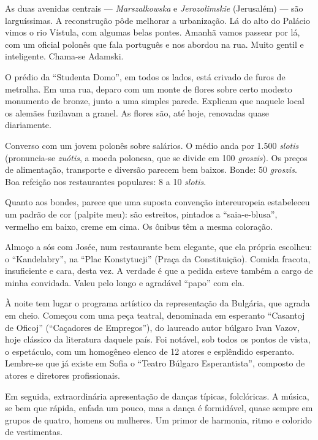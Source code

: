 As duas avenidas centrais --- \textit{Marszalkowska} e \textit{Jerozolimskie} (Jerusalém) --- são larguíssimas. A reconstrução pôde melhorar a urbanização. Lá do alto do Palácio vimos o rio Vístula, com algumas belas pontes. Amanhã vamos passear por lá, com um oficial polonês que fala português e nos abordou na rua. Muito gentil e inteligente. Chama-se Adamski.

O prédio da ``Studenta Domo'', em todos os lados, está crivado de furos de metralha. Em uma rua, deparo com um monte de flores sobre certo modesto monumento de bronze, junto a uma simples parede. Explicam que naquele local os alemães fuzilavam a granel. As flores são, até hoje, renovadas quase diariamente.

Converso com um jovem polonês sobre salários. O médio anda por 1.500 \textit{slotis} (pronuncia-se \textit{zuótis}, a moeda polonesa, que se divide em 100 \textit{groszis}). Os preços de alimentação, transporte e diversão parecem bem baixos. Bonde: 50 \textit{groszis}. Boa refeição nos restaurantes populares: 8 a 10 \textit{slotis}.

Quanto aos bondes, parece que uma suposta convenção intereuropeia estabeleceu um padrão de cor (palpite meu): são estreitos, pintados a ``saia-e-blusa'', vermelho em baixo, creme em cima. Os ônibus têm a mesma coloração.

Almoço a sós com Josée, num restaurante bem elegante, que ela própria escolheu: o ``Kandelabry'', na ``Plac Konstytucji'' (Praça da Constituição). Comida fracota, insuficiente e cara, desta vez. A verdade é que a pedida esteve também a cargo de minha convidada. Valeu pelo longo e agradável ``papo'' com ela.

À noite tem lugar o programa artístico da representação da Bulgária, que agrada em cheio. Começou com uma peça teatral, denominada em esperanto ``Casantoj de Oficoj'' (``Caçadores de Empregos''), do laureado autor búlgaro Ivan Vazov, hoje clássico da literatura daquele país. Foi notável, sob todos os pontos de vista, o espetáculo, com um homogêneo elenco de 12 atores e esplêndido esperanto. Lembre-se que já existe em Sofia o ``Teatro Búlgaro Esperantista'', composto de atores e diretores profissionais.

Em seguida, extraordinária apresentação de danças típicas, folclóricas. A música, se bem que rápida, enfada um pouco, mas a dança é formidável, quase sempre em grupos de quatro, homens ou mulheres. Um primor de harmonia, ritmo e colorido de vestimentas.

